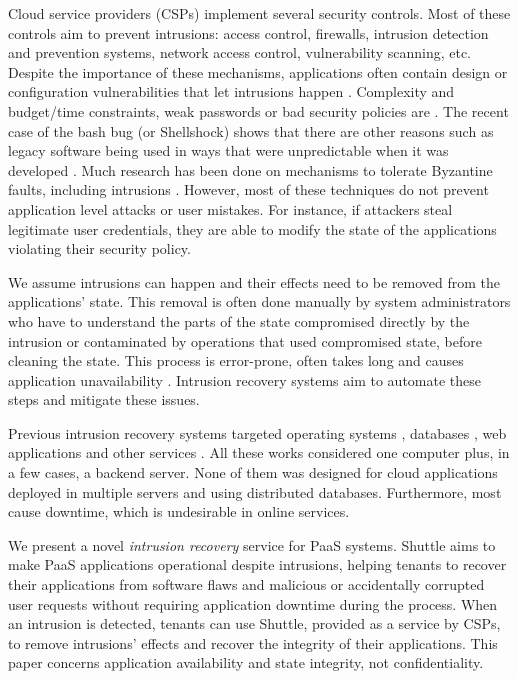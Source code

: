 \documentclass[10pt,conference]{IEEEtran}
\newcommand{\LONG}[1]{}
\begin{document}
Cloud service providers (CSPs) implement several security controls. Most of these controls aim to prevent intrusions: access control, firewalls, intrusion detection and prevention systems, network access control, vulnerability scanning, etc. Despite the importance of these mechanisms, applications often contain design or configuration vulnerabilities that let intrusions happen \cite{Williams2013}\LONG{Hubbard2010}. Complexity and budget/time constraints\LONG{Charette2005}, weak passwords or bad security policies are \DIFdelbegin {}\DIFdelend \DIFaddbegin {}\DIFaddend . The recent case of the bash bug (or Shellshock) shows that there are other reasons such as legacy software being used in ways that were unpredictable when it was developed \cite{Sidhpurwala:14}.
Much research has been done on mechanisms to tolerate Byzantine faults, including intrusions \cite{Verissimo2003}\LONG{Castro2002,Gupta:03}. However, most of these techniques do not prevent application level attacks or user mistakes. For instance, if attackers steal legitimate user credentials, they are able to modify the state of the applications violating their security policy. \LONG{In summary, there are several paths for intrusions to happen, even if mechanisms to prevent or tolerate them are used.}


We  assume intrusions can happen and their effects need to be removed from the applications' state. This removal is often done manually by system administrators who have to understand the parts of the state compromised directly by the intrusion or contaminated by operations that used compromised state, before cleaning the state. This process is error-prone, often takes long and causes application unavailability \cite{Brown2001}. Intrusion recovery systems aim to automate these steps and mitigate these issues.

Previous intrusion recovery systems targeted operating systems \cite{taser,retro,dare}, databases \cite{itdb,phoenix}, web applications \cite{Akkus2010,warp,aire} and other services \cite{undoForOperators}. All these works considered one computer plus, in a few cases, a backend server. None of them was designed for cloud applications deployed in multiple servers and using distributed databases. Furthermore, most cause downtime, which is undesirable in online services.

We present a novel \emph{intrusion recovery} service for \ac{PaaS} systems. Shuttle aims to make \ac{PaaS} applications operational despite intrusions, helping tenants to recover their applications from software flaws and malicious or accidentally corrupted user requests without requiring application downtime during the process. When an intrusion is detected, tenants can use Shuttle, provided as a service by CSPs, to remove intrusions' effects and recover the integrity of their applications. This paper concerns application availability and state integrity, not confidentiality.
\end{document}
